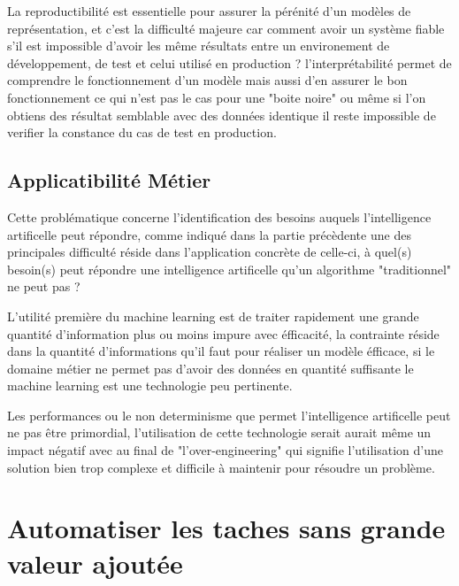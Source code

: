         La reproductibilité est essentielle pour assurer la pérénité d'un modèles de représentation, 
        et c'est la difficulté majeure car comment avoir un système fiable s'il est impossible 
        d'avoir les même résultats entre un environement de développement, de test et celui 
        utilisé en production ? l'interprétabilité permet de comprendre le fonctionnement 
        d'un modèle mais aussi d'en assurer le bon fonctionnement ce qui n'est pas le cas 
        pour une "boite noire" ou même si l'on obtiens des résultat semblable avec des données 
        identique il reste impossible de verifier la constance du cas de test en production. 
        \newline





        \section{Applicatibilité Métier}
            Cette problématique concerne l'identification des besoins auquels l'intelligence artificelle 
            peut répondre, comme indiqué dans la partie précèdente une des principales difficulté réside 
            dans l'application concrète de celle-ci, à quel(s) besoin(s) peut répondre une 
            intelligence artificelle qu'un algorithme "traditionnel" ne peut pas ? 
            \newline 

            L'utilité première du machine learning est de traiter rapidement une grande 
            quantité d'information plus ou moins impure avec éfficacité, la contrainte 
            réside dans la quantité d'informations qu'il faut pour réaliser un modèle 
            éfficace, si le domaine métier ne permet pas d'avoir des données en quantité 
            suffisante le machine learning est une technologie peu pertinente. 
            \newline 

            Les performances ou le non determinisme que permet l'intelligence artificelle
            peut ne pas être primordial, l'utilisation de cette technologie serait 
            aurait même un impact négatif avec au final de "l'over-engineering" 
            qui signifie l'utilisation d'une solution bien trop complexe et 
            difficile à maintenir pour résoudre un problème. 
            \newline  


    \chapter{Automatiser les taches sans grande valeur ajoutée}

